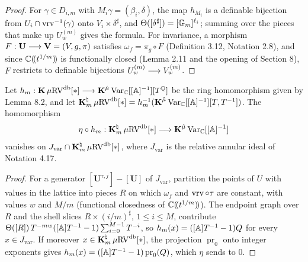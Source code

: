 \begin{proof}
For $\gamma \in D_{i,m}$ with $M_i \gamma = (\beta_i, \delta)$, the map $h_{M_i}$ is a definable bijection from $U_i \cap \operatorname{vrv}^{-1}(\gamma)$ onto $V_i \times \delta^\sharp$, and $\Theta([\delta^\sharp]) = [\mathbb{G}_m]^{\ell_i}$; summing over the pieces that make up $U^{(m)}_w$ gives the formula. For invariance, a morphism $F : \mathbf U \longrightarrow \mathbf V = (V, g, \pi)$ satisfies $\omega_f = \pi_g \circ F$ (Definition 3.12, Notation 2.8), and since $\mathbb{C}(\!(t^{1/m})\!)$ is functionally closed (Lemma 2.11 and the opening of Section 8), $F$ restricts to definable bijections $U^{(m)}_w \longrightarrow V^{(m)}_w$.
\end{proof}

\setcounter{theorem}{2}
\begin{lemma}
\label{PG-van}
\leanok
{}
Let $h_m : \operatorname{\mathbf{K}} \mu\mathrm{RV}^{\operatorname{db}}[*] \longrightarrow \operatorname{\mathbf{K}}^{\hat\mu}\mathrm{Var}_{\mathbb{C}}[[\mathbb{A}]^{-1}][T^{\mathbb{Q}}]$ be the ring homomorphism given by Lemma 8.2, and let $\operatorname{\mathbf{K}}^\natural_m \mu\mathrm{RV}^{\operatorname{db}}[*] = h_m^{-1}(\operatorname{\mathbf{K}}^{\hat\mu}\mathrm{Var}_{\mathbb{C}}[[\mathbb{A}]^{-1}][T,T^{-1}])$. The homomorphism \[ \eta \circ h_m : \operatorname{\mathbf{K}}^\natural_m \mu\mathrm{RV}^{\operatorname{db}}[*] \longrightarrow \operatorname{\mathbf{K}}^{\hat\mu}\mathrm{Var}_{\mathbb{C}}[[\mathbb{A}]^{-1}] \] vanishes on $J_{\mathrm{var}} \cap \operatorname{\mathbf{K}}^\natural_m \mu\mathrm{RV}^{\operatorname{db}}[*]$, where $J_{\mathrm{var}}$ is the relative annular ideal of Notation 4.17.
\end{lemma}

\begin{proof}
\leanok
For a generator $[\mathbf U^{\tau,j}] - [\mathbf U]$ of $J_{\mathrm{var}}$, partition the points of $U$ with values in the lattice into pieces $R$ on which $\omega_f$ and $\operatorname{vrv} \circ \tau$ are constant, with values $w$ and $M/m$ (functional closedness of $\mathbb{C}(\!(t^{1/m})\!)$). The endpoint graph over $R$ and the shell slices $R \times (i/m)^\sharp$, $1 \leq i \leq M$, contribute $\Theta([R])\, T^{-mw}([\mathbb{A}]T^{-1} - 1)\sum_{i=0}^{M-1} T^{-i}$, so $h_m(x) = ([\mathbb{A}]T^{-1} - 1)Q$ for every $x \in J_{\mathrm{var}}$. If moreover $x \in \operatorname{\mathbf{K}}^\natural_m \mu\mathrm{RV}^{\operatorname{db}}[*]$, the projection $\operatorname{pr}_0$ onto integer exponents gives $h_m(x) = ([\mathbb{A}]T^{-1} - 1)\operatorname{pr}_0(Q)$, which $\eta$ sends to $0$.
\end{proof}

